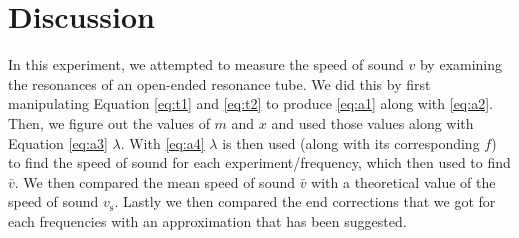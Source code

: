 \documentclass[letter]{article}
\numberwithin{equation}{section}
\numberwithin{figure}{section}
\numberwithin{table}{section}
\begin{document}
\section{Discussion}
In this experiment, we attempted to measure the speed of sound \(v\) by examining the resonances of an open-ended resonance tube. We did this by first manipulating Equation \ref{eq:t1} and \ref{eq:t2} to produce \eqref{eq:a1} along with \eqref{eq:a2}. Then, we figure out the values of \(m\) and \(x\) and used those values along with Equation \ref{eq:a3} \(\lambda\). With \eqref{eq:a4} \(\lambda\) is then used (along with its corresponding \(f\)) to find the speed of sound for each experiment/frequency, which then used to find \(\bar{v}\). We then compared the mean speed of sound \(\bar{v}\) with a theoretical value of the speed of sound \(v_\mathrm{s}\). Lastly we then compared the end corrections that we got for each frequencies with an approximation that has been suggested.
\end{document}
